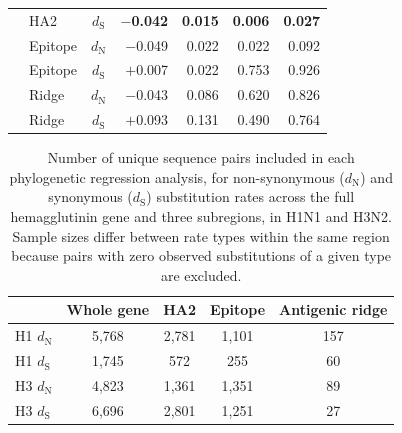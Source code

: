 \documentclass[11pt, a4paper]{article}
\begin{document}
\begin{table}[H]
\begin{tabular}{llcrrrr}
                      & HA2        & $d_{\text{S}}$  & \textbf{$-$0.042} & \textbf{0.015} & \textbf{0.006}    & \textbf{0.027}    \\
                      & Epitope    & $d_{\text{N}}$ & $-$0.049          & 0.022          & 0.022             & 0.092             \\
                      & Epitope    & $d_{\text{S}}$  & $+$0.007          & 0.022          & 0.753             & 0.926             \\
                      & Ridge      & $d_{\text{N}}$ & $-$0.043          & 0.086          & 0.620             & 0.826             \\
                      & Ridge      & $d_{\text{S}}$  & $+$0.093          & 0.131          & 0.490             & 0.764             \\
        \bottomrule
    \end{tabular}
\end{table}
\newpage

\begin{table}[H]
    \centering
    \caption{Number of unique sequence pairs included in each phylogenetic regression analysis, for non-synonymous ($d_{\text{N}}$) and synonymous ($d_{\text{S}}$) substitution rates across the full hemagglutinin gene and three subregions, in H1N1 and H3N2. Sample sizes differ between rate types within the same region because pairs with zero observed substitutions of a given type are excluded.}
    \label{tab:s2_epitope}
    \begin{tabular}{lcccc}
        \toprule
        & \textbf{Whole gene} & \textbf{HA2} & \textbf{Epitope} & \textbf{Antigenic ridge} \\
        \midrule
        H1 $d_{\text{N}}$ & 5{,}768 & 2{,}781 & 1{,}101 & 157 \\
        H1 $d_{\text{S}}$  & 1{,}745 &   572 &   255 &  60 \\
        H3 $d_{\text{N}}$ & 4{,}823 & 1{,}361 & 1{,}351 &  89 \\
        H3 $d_{\text{S}}$  & 6{,}696 & 2{,}801 & 1{,}251 &  27 \\
        \bottomrule
    \end{tabular}
\end{table}
\newpage
\end{document}
